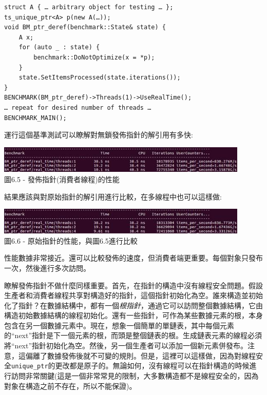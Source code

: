 \begin{lstlisting}[style=styleCXX]
struct A { … arbitrary object for testing … };
ts_unique_ptr<A> p(new A(…));
void BM_ptr_deref(benchmark::State& state) {
	A x;
	for (auto _ : state) {
		benchmark::DoNotOptimize(x = *p);
	}
	state.SetItemsProcessed(state.iterations());
}
BENCHMARK(BM_ptr_deref)->Threads(1)->UseRealTime();
… repeat for desired number of threads …
BENCHMARK_MAIN();
\end{lstlisting}

運行這個基準測試可以瞭解對無鎖發佈指針的解引用有多快:

\begin{center}
\includegraphics[width=0.9\textwidth]{content/2/chapter6/images/5.jpg}\\
圖6.5 - 發佈指針(消費者線程)的性能
\end{center}

結果應該與對原始指針的解引用進行比較，在多線程中也可以這樣做:

\begin{center}
\includegraphics[width=0.9\textwidth]{content/2/chapter6/images/6.jpg}\\
圖6.6 - 原始指針的性能，與圖6.5進行比較
\end{center}

性能數據非常接近。還可以比較發佈的速度，但消費者端更重要。每個對象只發布一次，然後進行多次訪問。

瞭解發佈指針不做什麼同樣重要。首先，在指針的構造中沒有線程安全問題。假設生產者和消費者線程共享對構造好的指針，這個指針初始化為空。誰來構造並初始化了指針？在數據結構中，都有一個\textit{根指針}，通過它可以訪問整個數據結構，它由構造初始數據結構的線程初始化。還有一些指針，可作為某些數據元素的根，本身包含在另一個數據元素中。現在，想象一個簡單的單鏈表，其中每個元素的“next”指針是下一個元素的根，而頭是整個鏈表的根。生成鏈表元素的線程必須將“next”指針初始化為空。然後，另一個生產者可以添加一個新元素併發布。注意，這偏離了數據發佈後就不可變的規則。但是，這裡可以這樣做，因為對線程安全\texttt{unique\_ptr}的更改都是原子的。無論如何，沒有線程可以在指針構造的時候進行訪問非常關鍵(這是一個非常常見的限制，大多數構造都不是線程安全的，因為對象在構造之前不存在，所以不能保證)。

